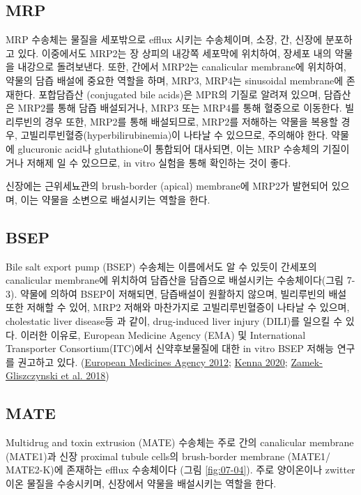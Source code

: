 \documentclass[
  11pt,
  krantz2, a4paper, twoside]{krantz}
\begin{document}
\hypertarget{mrp}{%
\subsection{MRP}\label{mrp}}

MRP 수송체는 물질을 세포밖으로 efflux 시키는 수송체이며, 소장, 간,
신장에 분포하고 있다. 이중에서도 MRP2는 장 상피의 내강쪽 세포막에
위치하여, 장세포 내의 약물을 내강으로 돌려보낸다. 또한, 간에서 MRP2는
canalicular membrane에 위치하여, 약물의 담즙 배설에 중요한 역할을 하며,
MRP3, MRP4는 sinusoidal membrane에 존재한다. 포합담즙산 (conjugated bile
acids)은 MPR의 기질로 알려져 있으며, 담즙산은 MRP2를 통해 담즙
배설되거나, MRP3 또는 MRP4를 통해 혈중으로 이동한다. 빌리루빈의 경우
또한, MRP2를 통해 배설되므로, MRP2를 저해하는 약물을 복용할 경우,
고빌리루빈혈증(hyperbilirubinemia)이 나타날 수 있으므로, 주의해야 한다.
약물에 glucuronic acid나 glutathione이 통합되어 대사되면, 이는 MRP
수송체의 기질이거나 저해제 일 수 있으므로, in vitro 실험을 통해 확인하는
것이 좋다.

신장에는 근위세뇨관의 brush-border (apical) membrane에 MRP2가 발현되어
있으며, 이는 약물을 소변으로 배설시키는 역할을 한다.

\hypertarget{bsep}{%
\subsection{BSEP}\label{bsep}}

Bile salt export pump (BSEP) 수송체는 이름에서도 알 수 있듯이 간세포의
canalicular membrane에 위치하여 담즙산을 담즙으로 배설시키는
수송체이다(그림 7-3). 약물에 의하여 BSEP이 저해되면, 담즙배설이 원활하지
않으며, 빌리루빈의 배설 또한 저해할 수 있어, MRP2 저해와 마찬가지로
고빌리루빈혈증이 나타날 수 있으며, cholestatic liver disease등 과 같이,
drug-induced liver injury (DILI)를 일으킬 수 있다. 이러한 이유로,
European Medicine Agency (EMA) 및 International Transporter
Consortium(ITC)에서 신약후보물질에 대한 in vitro BSEP 저해능 연구를
권고하고 있다. (\protect\hyperlink{ref-european2012guideline}{European Medicines Agency 2012}; \protect\hyperlink{ref-kenna2020sc1}{Kenna 2020}; \protect\hyperlink{ref-zamek2018transporters}{Zamek-Gliszczynski et al. 2018})

\hypertarget{mate}{%
\subsection{MATE}\label{mate}}

Multidrug and toxin extrusion (MATE) 수송체는 주로 간의 canalicular
membrane (MATE1)과 신장 proximal tubule cells의 brush-border membrane
(MATE1/ MATE2-K)에 존재하는 efflux 수송체이다 (그림 \ref{fig:07-04}).
주로 양이온이나 zwitter 이온 물질을 수송시키며, 신장에서 약물을
배설시키는 역할을 한다.
\end{document}
